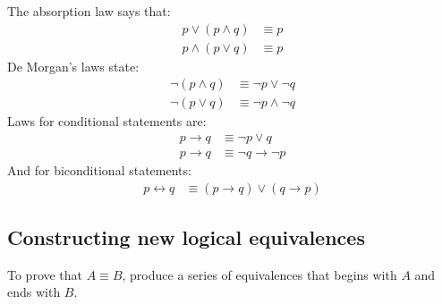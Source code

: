 The absorption law says that:
\begin{align}
    p \lor (p \land q) & \equiv p \\
    p \land (p \lor q) & \equiv p
\end{align}
De Morgan's laws state:
\begin{align}
    \neg(p \land q) & \equiv \neg p \lor \neg q  \\
    \neg(p \lor q)  & \equiv \neg p \land \neg q
\end{align}
Laws for conditional statements are:
\begin{align}
    p \rightarrow q & \equiv \neg p \lor q             \\
    p \rightarrow q & \equiv \neg q \rightarrow \neg p
\end{align}
And for biconditional statements:
\begin{align}
    p \leftrightarrow q & \equiv (p \rightarrow q) \lor (q \rightarrow p)
\end{align}

\subsection{Constructing new logical equivalences}
To prove that \(A \equiv B\), produce a series of equivalences that begins with \(A\) and ends with \(B\).
